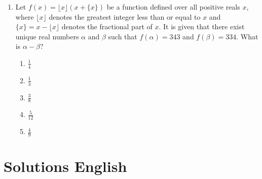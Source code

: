 \documentclass[12pt]{scrartcl}
\begin{document}
\begin{enumerate}
\item Let $f(x)=\lfloor x\rfloor(x+\{x\})$ be a function defined over all positive reals $x$, where $\lfloor x\rfloor$ denotes the greatest integer less than or equal to $x$ and $\{x\}=x-\lfloor x\rfloor$ denotes the fractional part of $x$. It is given that there exist unique real numbers $\alpha$ and $\beta$ such that $f(\alpha)=343$ and $f(\beta)=334$. What is $\alpha-\beta$?
\begin{enumerate}
    \item $\frac{1}{4}$
    \item $\frac{1}{3}$
    \item $\frac{3}{8}$
    \item $\frac{5}{12}$
    \item $\frac{4}{9}$
\end{enumerate}

\end{enumerate}

\section*{Solutions English}
\end{document}
